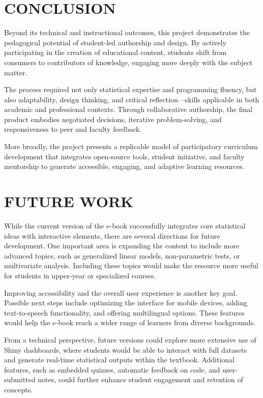 \documentclass[11pt]{article}
\begin{document}
\section{CONCLUSION}

Beyond its technical and instructional outcomes, this project demonstrates the pedagogical potential of student-led authorship and design. By actively participating in the creation of educational content, students shift from consumers to contributors of knowledge, engaging more deeply with the subject matter.

The process required not only statistical expertise and programming fluency, but also adaptability, design thinking, and critical reflection—skills applicable in both academic and professional contexts. Through collaborative authorship, the final product embodies negotiated decisions, iterative problem-solving, and responsiveness to peer and faculty feedback.

More broadly, the project presents a replicable model of participatory curriculum development that integrates open-source tools, student initiative, and faculty mentorship to generate accessible, engaging, and adaptive learning resources.

\section{FUTURE WORK}

While the current version of the e-book successfully integrates core statistical ideas with interactive elements, there are several directions for future development. One important area is expanding the content to include more advanced topics, such as generalized linear models, non-parametric tests, or multivariate analysis. Including these topics would make the resource more useful for students in upper-year or specialized courses.

Improving accessibility and the overall user experience is another key goal. Possible next steps include optimizing the interface for mobile devices, adding text-to-speech functionality, and offering multilingual options. These features would help the e-book reach a wider range of learners from diverse backgrounds.

From a technical perspective, future versions could explore more extensive use of Shiny dashboards, where students would be able to interact with full datasets and generate real-time statistical outputs within the textbook. Additional features, such as embedded quizzes, automatic feedback on code, and user-submitted notes, could further enhance student engagement and retention of concepts.
\end{document}
